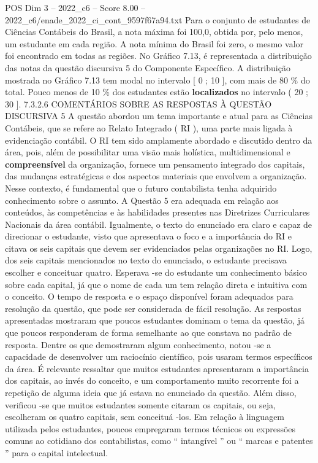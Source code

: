 \begin{textsample}{POS Dim 3 – 2022\_c6 – Score 8.00 – 2022\_c6/enade\_2022\_ci\_cont\_9597f67a94.txt}
Para o conjunto de estudantes de Ciências Contábeis do Brasil, a nota máxima foi 100,0, obtida por, pelo menos, um estudante em cada região.
A nota mínima do Brasil foi zero, o mesmo valor foi encontrado em todas as regiões.
No Gráfico 7.13, é representada a distribuição das notas da questão discursiva 5 do Componente Específico.
A distribuição mostrada no Gráfico 7.13 tem modal no intervalo [ 0 ; 10 ], com mais de 80 \% do total.
Pouco menos de 10 \% dos estudantes estão \textbf{localizados} no intervalo ( 20 ; 30 ]. 7.3.2.6 COMENTÁRIOS SOBRE AS RESPOSTAS À QUESTÃO DISCURSIVA 5 A questão abordou um tema importante e atual para as Ciências Contábeis, que se refere ao Relato Integrado ( RI ), uma parte mais ligada à evidenciação contábil.
O RI tem sido amplamente abordado e discutido dentro da área, pois, além de possibilitar uma visão mais holística, multidimensional e \textbf{compreensível} da organização, fornece um pensamento integrado dos capitais, das mudanças estratégicas e dos aspectos materiais que envolvem a organização.
Nesse contexto, é fundamental que o futuro contabilista tenha adquirido conhecimento sobre o assunto.
A Questão 5 era adequada em relação aos conteúdos, às competências e às habilidades presentes nas Diretrizes Curriculares Nacionais da área contábil.
Igualmente, o texto do enunciado era claro e capaz de direcionar o estudante, visto que apresentava o foco e a importância do RI e citava os seis capitais que devem ser evidenciados pelas organizações no RI.
Logo, dos seis capitais mencionados no texto do enunciado, o estudante precisava escolher e conceituar quatro.
Esperava -se do estudante um conhecimento básico sobre cada capital, já que o nome de cada um tem relação direta e intuitiva com o conceito.
O tempo de resposta e o espaço disponível foram adequados para resolução da questão, que pode ser considerada de fácil resolução.
As respostas apresentadas mostraram que poucos estudantes dominam o tema da questão, já que poucos responderam de forma semelhante ao que constava no padrão de resposta.
Dentre os que demostraram algum conhecimento, notou -se a capacidade de desenvolver um raciocínio científico, pois usaram termos específicos da área.
É relevante ressaltar que muitos estudantes apresentaram a importância dos capitais, ao invés do conceito, e um comportamento muito recorrente foi a repetição de alguma ideia que já estava no enunciado da questão.
Além disso, verificou -se que muitos estudantes somente citaram os capitais, ou seja, escolheram os quatro capitais, sem conceituá -los.
Em relação à linguagem utilizada pelos estudantes, poucos empregaram termos técnicos ou expressões comuns ao cotidiano dos contabilistas, como “ intangível ” ou “ marcas e patentes ” para o capital intelectual.

\end{textsample}

